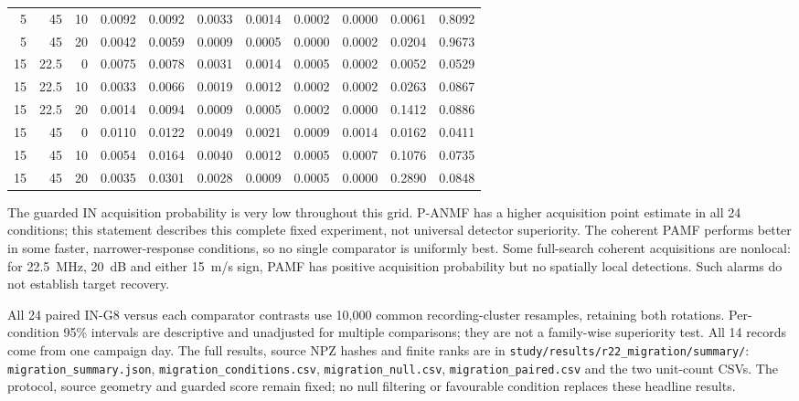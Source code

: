 \documentclass[10pt]{article}
\begin{document}
\begin{table}[htbp]
\begin{tabular}{rrr*{8}{r}}
5 & 45 & 10 & 0.0092 & 0.0092 & 0.0033 & 0.0014 & 0.0002 & 0.0000 & 0.0061 & 0.8092\\
5 & 45 & 20 & 0.0042 & 0.0059 & 0.0009 & 0.0005 & 0.0000 & 0.0002 & 0.0204 & 0.9673\\
15 & 22.5 & 0 & 0.0075 & 0.0078 & 0.0031 & 0.0014 & 0.0005 & 0.0002 & 0.0052 & 0.0529\\
15 & 22.5 & 10 & 0.0033 & 0.0066 & 0.0019 & 0.0012 & 0.0002 & 0.0002 & 0.0263 & 0.0867\\
15 & 22.5 & 20 & 0.0014 & 0.0094 & 0.0009 & 0.0005 & 0.0002 & 0.0000 & 0.1412 & 0.0886\\
15 & 45 & 0 & 0.0110 & 0.0122 & 0.0049 & 0.0021 & 0.0009 & 0.0014 & 0.0162 & 0.0411\\
15 & 45 & 10 & 0.0054 & 0.0164 & 0.0040 & 0.0012 & 0.0005 & 0.0007 & 0.1076 & 0.0735\\
15 & 45 & 20 & 0.0035 & 0.0301 & 0.0028 & 0.0009 & 0.0005 & 0.0000 & 0.2890 & 0.0848\\
\bottomrule\end{tabular}\end{table}
The guarded IN acquisition probability is very low throughout this grid. P-ANMF has a higher acquisition point estimate in all 24 conditions; this statement describes this complete fixed experiment, not universal detector superiority. The coherent PAMF performs better in some faster, narrower-response conditions, so no single comparator is uniformly best. Some full-search coherent acquisitions are nonlocal: for 22.5~MHz, 20~dB and either 15~m/s sign, PAMF has positive acquisition probability but no spatially local detections. Such alarms do not establish target recovery.

All 24 paired IN-G8 versus each comparator contrasts use 10,000 common recording-cluster resamples, retaining both rotations. Per-condition 95\% intervals are descriptive and unadjusted for multiple comparisons; they are not a family-wise superiority test. All 14 records come from one campaign day. The full results, source NPZ hashes and finite ranks are in \texttt{study/results/r22\_migration/summary/}: \texttt{migration\_summary.json}, \texttt{migration\_conditions.csv}, \texttt{migration\_null.csv}, \texttt{migration\_paired.csv} and the two unit-count CSVs. The protocol, source geometry and guarded score remain fixed; no null filtering or favourable condition replaces these headline results.
\end{document}
